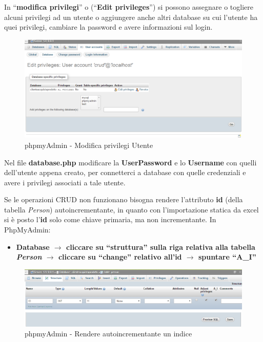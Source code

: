In “\textbf{modifica privilegi}” o (“\textbf{Edit privileges}”) si possono assegnare o togliere alcuni privilegi ad un utente o aggiungere anche altri database su cui l’utente ha quei privilegi, cambiare la password e avere informazioni sul login. 

\begin{center}
\begin{figure}[H]
\centering
\includegraphics[scale=0.8]{figures/editprivileges.png}
\caption{phpmyAdmin - Modifica privilegi Utente} 
\end{figure}
\end{center}

Nel file \textbf{database.php} modificare la \textbf{UserPassword} e lo \textbf{Username} con quelli dell’utente appena creato, per connetterci a database con quelle credenziali e avere i privilegi associati a tale utente.

Se le operazioni CRUD non funzionano bisogna rendere l’attributo \textbf{id} (della tabella \textit{Person}) autoincrementante, in quanto con l’importazione statica da excel si è posto l’\textbf{id} solo come chiave primaria, ma non incrementante. In PhpMyAdmin:  

\begin{itemize}

\item \textbf{Database $\rightarrow$ cliccare su “struttura” sulla riga relativa alla tabella \textit{Person} $\rightarrow$ cliccare su “change” relativo all’id $\rightarrow$ spuntare “A\_I”}

\end{itemize}

\begin{center}
\begin{figure}[H]
\centering
\includegraphics[scale=0.8]{figures/AI.png}
\caption{phpmyAdmin - Rendere autoincrementante un indice} 
\end{figure}
\end{center}

